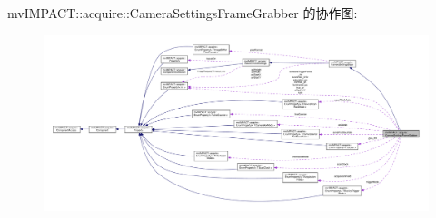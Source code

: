 mv\+I\+M\+P\+A\+C\+T\+:\+:acquire\+:\+:Camera\+Settings\+Frame\+Grabber 的协作图\+:
\nopagebreak
\begin{figure}[H]
\begin{center}
\leavevmode
\includegraphics[width=350pt]{classmv_i_m_p_a_c_t_1_1acquire_1_1_camera_settings_frame_grabber__coll__graph}
\end{center}
\end{figure}
